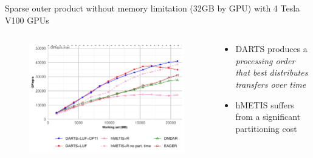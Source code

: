 \documentclass{libs/ufc_format}
\begin{document}
{%
\begin{frame}[noframenumbering]{Sparse outer product without memory limitation (32GB by GPU) with 4 Tesla V100 GPUs}
    \begin{columns}{}
		\begin{column}{0.7\textwidth}
		\begin{figure}
			\center\includegraphics[scale = 0.45]{Images/GF_dynamic_data_aware_no_hfp_sparse_matrix_infinie_gemini-1-fgcs_4GPU.pdf}
		\end{figure}
		\end{column}
		\begin{column}{0.3\textwidth}
		\begin{itemize}
			\item DARTS produces a \emph{processing order that best distributes transfers over time} 
			\item hMETIS suffers from a significant partitioning cost
		\end{itemize}
		\end{column}
	\end{columns}
\end{frame}
}
\end{document}
